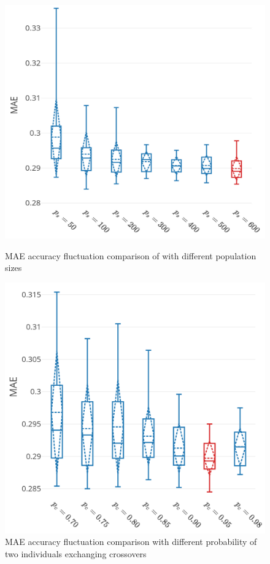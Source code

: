 \documentclass[conference]{IEEEtran}
\begin{document}
\begin{figure}[h]
	\centering
	\begin{minipage}[t]{8cm}
		\centering
		\includegraphics[width=0.75\textwidth =0.2cm 0.2cm 0.2cm 0.2cm]{images/tn2_multi_cpu_best_ps_scale.pdf}
		\caption{MAE accuracy fluctuation comparison of with different population sizes} 
		\label{tn2_CPU_ps_FLGANN}
	\end{minipage}
	\hspace{0.5cm}
	\begin{minipage}[t]{8cm}
		\centering
		\includegraphics[width=0.75\textwidth =0.2cm 0.2cm 0.2cm 0.2cm]{images/tn2_multi_cpu_best_pc.pdf}
		\caption{MAE accuracy fluctuation comparison with different probability of two individuals exchanging crossovers} 
		\label{tn2_CPU_pc_FLGANN}
	\end{minipage}
\end{figure}
\end{document}
